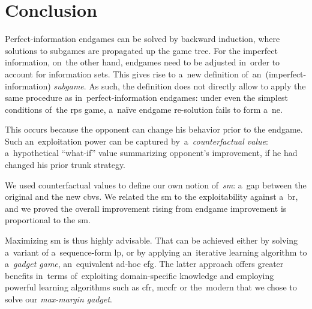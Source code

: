\chapter*{Conclusion}
Perfect-information endgames can be solved by backward induction, where solutions to subgames are propagated up the game tree.
For the imperfect information, on~the other hand, endgames need to be adjusted in~order to account for information sets.
This gives rise to a~new definition of~an~(imperfect-information) \emph{subgame}.
As such, the definition does not directly allow to apply the same procedure as in~perfect-information endgames:
under even the simplest conditions of~the \acrlong{rps} game, a~na{\"i}ve endgame re-solution fails to form a~\acrlong{ne}.

This occurs because the opponent can change his behavior prior to the endgame.
Such an~exploitation power can be captured by~a~\emph{counterfactual value}:
a~hypothetical ``what-if'' value summarizing opponent's improvement, if he had changed his prior trunk strategy.

We used counterfactual values to define our own notion of~\emph{\acrlong{sm}}:
a~gap between the original and the new \acrlong{cbv}s.
We related the \acrshort{sm} to the exploitability against a~\acrlong{br}, and we proved the overall improvement rising from endgame improvement is proportional to the \acrshort{sm}.

Maximizing \acrshort{sm} is thus highly advisable.
That can be achieved either by solving a~variant of a~sequence-form \acrlong{lp}, or by applying an~iterative learning algorithm to a~\emph{gadget game}, an~equivalent ad-hoc \acrlong{efg}.
The latter approach offers greater benefits in~terms of~exploiting domain-specific knowledge and employing powerful learning algorithms such as \acrshort{cfr}, \acrshort{mccfr} or the~modern \cfrplus{} that we chose to solve our \emph{max-margin gadget}.

